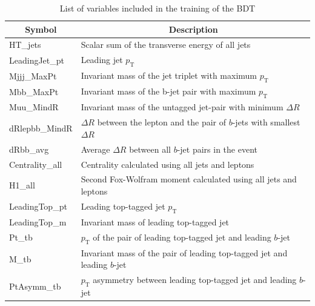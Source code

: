 \begin{table}[H]
  \centering
  \begin{tabular*}{150mm}{@{\extracolsep{\fill}}ll}
    \hline
    \multicolumn{1}{c}{Symbol} & \multicolumn{1}{c}{Description}\\
    \hline\hline
    HT\_jets                                   & Scalar sum of the transverse energy of all jets\\
    LeadingJet\_pt                             & Leading jet $p_\text{T}$\\
    Mjjj\_MaxPt                                & Invariant mass of the jet triplet with maximum $p_\text{T}$\\
    Mbb\_MaxPt                                 & Invariant mass of the b-jet pair with maximum $p_\text{T}$\\
    Muu\_MindR                                 & Invariant mass of the untagged jet-pair with minimum $\Delta{R}$\\
    dRlepbb\_MindR                             & $\Delta{R}$ between the lepton and the pair of $b$-jets with smallest $\Delta{R}$\\
    dRbb\_avg                                  & Average $\Delta{R}$ between all $b$-jet pairs in the event\\
    Centrality\_all                            & Centrality calculated using all jets and leptons\\
    H1\_all                                    & Second Fox-Wolfram moment calculated using all jets and leptons\\
    LeadingTop\_pt                             & Leading top-tagged jet $p_\text{T}$\\
    LeadingTop\_m                              & Invariant mass of leading top-tagged jet \\
    Pt\_tb                                     & $p_\text{T}$ of the pair of leading top-tagged jet and leading $b$-jet\\
    M\_tb                                      & Invariant mass of the pair of leading top-tagged jet and leading $b$-jet\\
    PtAsymm\_tb                                & $p_\text{T}$ asymmetry between leading top-tagged jet and leading $b$-jet\\
    \hline
  \end{tabular*}
  \caption{List of variables included in the training of the BDT}
  \label{tab:BDTInputVariables}
\end{table}

